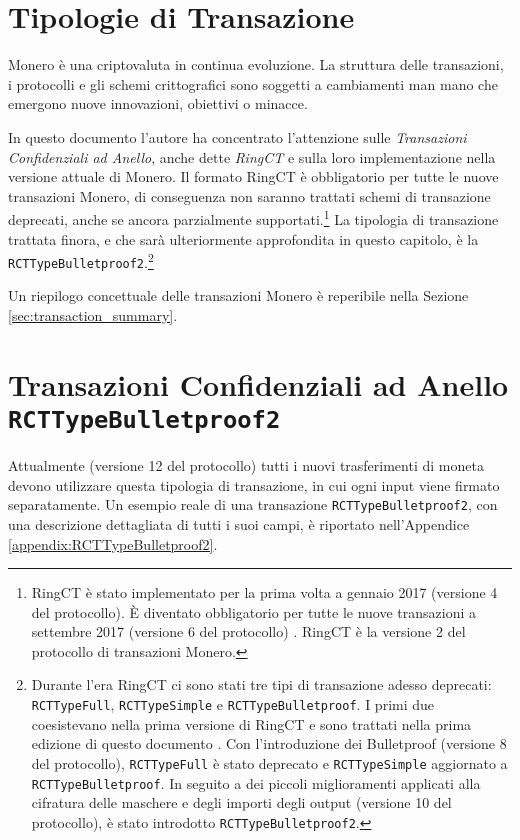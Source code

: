 \section{Tipologie di Transazione}
\label{sec:transaction_types}

Monero è una criptovaluta in continua evoluzione. La struttura delle transazioni, i protocolli e gli schemi crittografici sono soggetti a cambiamenti man mano che emergono nuove innovazioni, obiettivi o minacce.

In questo documento l'autore ha concentrato l’attenzione sulle {\em Transazioni Confidenziali ad Anello}, anche dette {\em RingCT} e sulla loro implementazione nella versione attuale di Monero. Il formato RingCT è obbligatorio per tutte le nuove transazioni Monero, di conseguenza non saranno trattati schemi di transazione deprecati, anche se ancora parzialmente supportati.\footnote{RingCT è stato implementato per la prima volta a gennaio 2017 (versione 4 del protocollo). È diventato obbligatorio per tutte le nuove transazioni a settembre 2017 (versione 6 del protocollo) \cite{ringct-dates}. RingCT è la versione 2 del protocollo di transazioni Monero.} La tipologia di transazione trattata finora, e che sarà ulteriormente approfondita in questo capitolo, è la {\tt RCTTypeBulletproof2}.\footnote{Durante l’era RingCT ci sono stati tre tipi di transazione adesso deprecati: {\tt RCTTypeFull}, {\tt RCTTypeSimple} e {\tt RCTTypeBulletproof}. I primi due coesistevano nella prima versione di RingCT e sono trattati nella prima edizione di questo documento \cite{ztm-1}. Con l’introduzione dei Bulletproof (versione 8 del protocollo), {\tt RCTTypeFull} è stato deprecato e {\tt RCTTypeSimple} aggiornato a {\tt RCTTypeBulletproof}. In seguito a dei piccoli miglioramenti applicati alla cifratura delle maschere e degli importi degli output (versione 10 del protocollo), è stato introdotto {\tt RCTTypeBulletproof2}.}

Un riepilogo concettuale delle transazioni Monero è reperibile nella Sezione \ref{sec:transaction_summary}.



\section{Transazioni Confidenziali ad Anello {\tt RCTTypeBulletproof2}}
\label{sec:RCTTypeBulletproof2}

Attualmente (versione 12 del protocollo) tutti i nuovi trasferimenti di moneta devono utilizzare questa tipologia di transazione, in cui ogni input viene firmato separatamente. Un esempio reale di una transazione {\tt RCTTypeBulletproof2}, con una descrizione dettagliata di tutti i suoi campi, è riportato nell'Appendice \ref{appendix:RCTTypeBulletproof2}.


